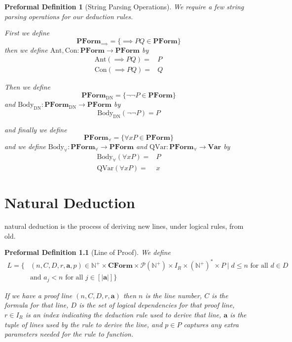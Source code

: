 \documentclass[oneside, 12pt]{book}
\theoremstyle{break}
\newtheorem{preformal definition}[definition]{Preformal Definition}
\newtheorem{preformal theorem}[theorem]{Preformal Theorem}
\newcommand{\bv}[1]{\boldsymbol{#1}}
\newcommand{\mc}[1]{\mathcal{#1}}
\newcommand{\N}[0]{\mathbb{N}}
\newcommand{\norm}[1]{\left|#1\right|}
\begin{document}
		\begin{preformal definition}[String Parsing Operations]
			We require a few string parsing operations for our deduction rules.
			
			First we define
			\begin{equation*}
				\textbf{PForm}_{\implies} = \{\implies PQ \in \textbf{PForm}\}
			\end{equation*}
			then we define $\text{Ant}, \text{Con}: \textbf{PForm}\to\textbf{PForm}$ by
			\begin{align*}
				\text{Ant}(\implies PQ) =& P\\
				\text{Con}(\implies PQ) =& Q
			\end{align*}
			
			Then we define
			\begin{equation*}
				\textbf{PForm}_{\text{DN}} = \{\lnot\lnot P \in \textbf{PForm}\}
			\end{equation*}
			and $\text{Body}_{\text{DN}}: \textbf{PForm}_{\text{DN}} \to \textbf{PForm}$ by
			\begin{equation*}
				\text{Body}_{\text{DN}}(\lnot \lnot P) = P
			\end{equation*}
			
			and finally we define
			\begin{equation*}
				\textbf{PForm}_{\forall} = \{\forall x P \in \textbf{PForm}\}
			\end{equation*}
			and we define $\text{Body}_{\forall}: \textbf{PForm}_{\forall} \to \textbf{PForm}$ and $\text{QVar}: \textbf{PForm}_{\forall} \to \textbf{Var}$ by
			\begin{align*}
				\text{Body}_{\forall}(\forall xP) =& P\\
				\text{QVar}(\forall x P) =& x
			\end{align*}			
		\end{preformal definition}
	
	\chapter{Natural Deduction}
		natural deduction is the process of deriving new lines, under logical rules, from old.
		
		\begin{preformal definition}[Line of Proof]
			We define 
			\begin{align*}
				L = \{&(n, C, D, r, \bv{a}, p) \in \N^+ \times \textbf{CForm} \times \mc{P}(\N^+) \times I_R \times (\N^+)^*\times P \mid d \le n \text{ for all } d \in D\\
				&\text{and } a_j < n \text{ for all } j \in [\norm{\bv{a}}]\}
			\end{align*}
			
			If we have a proof line $(n, C, D, r, \bv{a})$ then $n$ is the line number, $C$ is the formula for that line, $D$ is the set of logical dependencies for that proof line, $r\in I_R$ is an index indicating the deduction rule used to derive that line, $\bv{a}$ is the tuple of lines used by the rule to derive the line, and $p\in P$ captures any extra parameters needed for the rule to function.
		\end{preformal definition}
	
\end{document}
